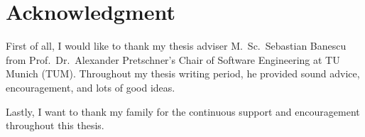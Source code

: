\newpage
\thispagestyle{empty}
\section*{Acknowledgment}
First of all, I would like to thank my thesis adviser M.~Sc.~Sebastian Banescu from Prof.~Dr.~Alexander Pretschner's Chair of Software Engineering at TU Munich (TUM). Throughout my thesis writing period, he provided sound advice, encouragement, and lots of good ideas.

\bigskip

Lastly, I want to thank my family for the continuous support and encouragement throughout this thesis.